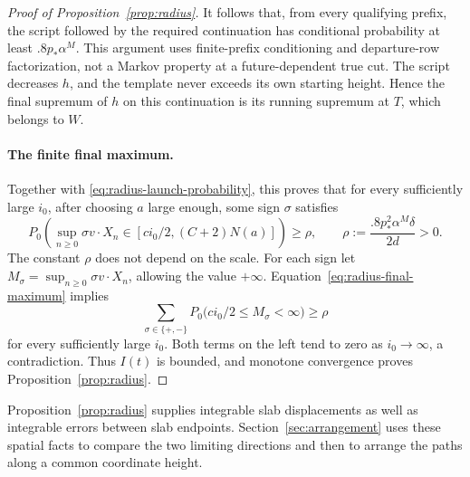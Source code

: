 \begin{proof}[Proof of Proposition~\ref{prop:radius}]
It follows that, from every qualifying prefix, the script followed by
the required continuation has conditional probability at least
\(.8p_*\alpha^M\).  This argument uses finite-prefix conditioning
and departure-row factorization, not a Markov property at a
future-dependent true cut.  The script decreases \(h\), and the
template never exceeds its own starting height.  Hence the final
supremum of \(h\) on this continuation is its running supremum at
\(T\), which belongs to \(W\).

\paragraph{The finite final maximum.}
Together with \eqref{eq:radius-launch-probability}, this proves that
for every sufficiently large \(i_0\), after choosing \(a\) large
enough, some sign \(\sigma\) satisfies
\begin{equation}\label{eq:radius-final-maximum}
 P_0\left(\sup_{n\ge0}\sigma v\cdot X_n
       \in[ci_0/2,(C+2)N(a)]\right)
 \ge \rho,
 \qquad
 \rho:=\frac{.8p_*^2\alpha^M\delta}{2d}>0.
\end{equation}
The constant \(\rho\) does not depend on the scale.  For each sign let
\(M_\sigma=\sup_{n\ge0}\sigma v\cdot X_n\), allowing the value
\(+\infty\).  Equation~\eqref{eq:radius-final-maximum} implies
\[
 \sum_{\sigma\in\{+,-\}}
 P_0\bigl(ci_0/2\le M_\sigma<\infty\bigr)\ge\rho
\]
for every sufficiently large \(i_0\).  Both terms on the left tend to
zero as \(i_0\to\infty\), a contradiction.  Thus \(I(t)\) is bounded, and
monotone convergence proves Proposition~\ref{prop:radius}.
\end{proof}

Proposition~\ref{prop:radius} supplies integrable slab displacements as well as
integrable errors between slab endpoints.  Section~\ref{sec:arrangement} uses these
spatial facts to compare the two limiting directions and then to arrange
the paths along a common coordinate height.
